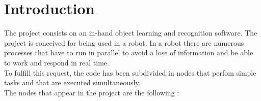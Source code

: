 

%
\newpage
%
\tableofcontents
\listoffigures

\newpage


\section{Introduction}
\hspace{0.5cm}The project consists on an in-hand object learning and recognition software. 
The project is conceived for being used in a robot. In a robot there are numerous processes that have to run in parallel to avoid a lose of information and be able to work and respond in real time. 
\\
To fulfill this request, the code has been subdivided in nodes that perfom simple tasks and that are executed simultaneously. 
\\
The nodes that appear in the project are the following : 

